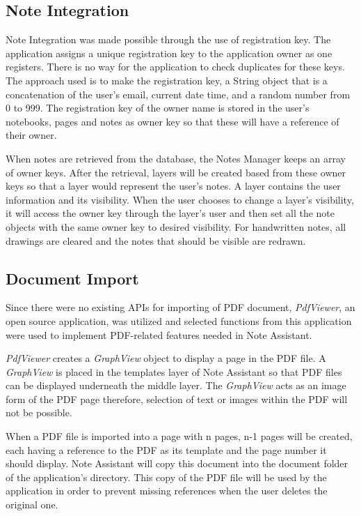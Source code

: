 \subsection{Note Integration}
\label{sec:noteintegration}

Note Integration was made possible through the use of registration key.  The application assigns a unique registration key to the application owner as one registers. There is no way for the application to check duplicates for these keys. The approach used is to make the registration key, a String object that is a concatenation of the user's email, current date time, and a random number from 0 to 999. The registration key of the owner name is stored in the user's notebooks, pages and notes as owner key so that these will have a reference of their owner.

When notes are retrieved from the database, the Notes Manager keeps an array of owner keys. After the retrieval, layers will be created based from these owner keys so that a layer would represent the user's notes. A layer contains the user information and its visibility. When the user chooses to change a layer's visibility, it will access the owner key through the layer's user and then set all the note objects with the same owner key to desired visibility. For handwritten notes, all drawings are cleared and the notes that should be visible are redrawn. 

\subsection{Document Import}
\label{sec:documentimport}

Since there were no existing APIs for importing of PDF document, \textit{PdfViewer}, an open source application, was utilized and selected functions from this application were used to implement PDF-related features needed in Note Assistant. 

\textit{PdfViewer} creates a \textit{GraphView} object to display a page in the PDF file. A \textit{GraphView} is placed in the templates layer of Note Assistant so that PDF files can be displayed underneath the middle layer. The \textit{GraphView} acts as an image form of the PDF page therefore, selection of text or images within the PDF will not be possible.

When a PDF file is imported into a page with n pages, n-1 pages will be created, each having a reference to the PDF as its template and the page number it should display. Note Assistant will copy this document into the document folder of the application's directory. This copy of the PDF file will be used by the application in order to prevent missing references when the user deletes the original one.
